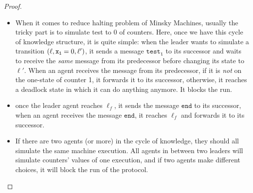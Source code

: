 \begin{proof}
\begin{itemize}
		\item When it comes to reduce halting problem of Minsky Machines, usually the tricky part is to simulate test to 0 of counters. Here, once we have this cycle of knowledge structure, it is quite simple: when the leader wants to simulate a transition $(\ell, \mathtt{\mathtt{x}_1}=0, \ell')$, it sends a message $\mathtt{test_1}$ to its successor and waits to receive the \emph{same} message from its predecessor before changing its state to $\ell'$. When an agent receives the message from its predecessor, if it is \emph{not} on the one-state of counter 1, it forwards it to its successor, otherwise, it reaches a deadlock state in which it can do anything anymore. It blocks the run.
		
		\item once the leader agent reaches $\ell_f$, it sends the message $\mathtt{end}$ to its successor, when an agent receives the message $\mathtt{end}$, it reaches $\ell_f$ and forwards it to its successor.
		
		\item If there are two agents (or more) in the cycle of knowledge, they should all simulate the same machine execution. All agents in between two leaders will simulate counters' values of one execution, and if two agents make different choices, it will block the run of the protocol. 
	\end{itemize}
\end{proof}